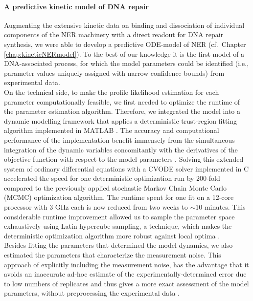 \paragraph{A predictive kinetic model of DNA repair}
Augmenting the extensive kinetic data on binding and dissociation of individual components of the NER machinery \cite{Luijsterburg2010} with a direct readout for DNA repair synthesis, we were able to develop a predictive ODE-model of NER (cf.\ Chapter \ref{chap:kineticNERmodel}). To the best of our knowledge it is the first model of a DNA-associated process, for which the model parameters could be identified (i.e., parameter values uniquely assigned with narrow confidence bounds) from experimental data. \\
On the technical side, to make the profile likelihood estimation for each parameter computationally feasible, we first needed to optimize the runtime of the parameter estimation algorithm. Therefore, we integrated the model into a dynamic modelling framework that applies a deterministic trust-region fitting algorithm implemented in MATLAB \cite{Raue2009}. The accuracy and computational performance of the implementation benefit immensely from the simultaneous integration of the dynamic variables concomitantly with the derivatives of the objective function with respect to the model parameters \cite{conn2009introduction,Ramachandran2010,Raue2013}. Solving this extended system of ordinary differential equations with a CVODE solver implemented in C accelerated the speed for one deterministic optimization run by 200-fold compared to the previously applied stochastic Markov Chain Monte Carlo (MCMC) optimization algorithm. The runtime spent for one fit on a 12-core processor with 3 GHz each is now reduced from two weeks to $\sim$10 minutes. This considerable runtime improvement allowed us to sample the parameter space exhaustively using Latin hypercube sampling, a technique, which makes the deterministic optimization algorithm more robust against local optima \cite{Raue2013}.\\
Besides fitting the parameters that determined the model dynamics, we also estimated the parameters that characterize the measurement noise. This approach of explicitly including the measurement noise, has the advantage that it avoids an inaccurate ad-hoc estimate of the experimentally-determined error due to low numbers of replicates and thus gives a more exact assessment of the model parameters, without preprocessing the experimental data \cite{Raue2013}. \\
